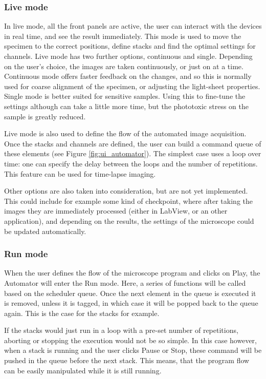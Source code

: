 \documentclass{diploma_style}
\begin{document}
\subsubsection{Live mode}
\label{automator:live}
In live mode, all the front panels are active, the user can interact with the devices in real time, and see the result immediately. This mode is used to move the specimen to the correct positions, define stacks and find the optimal settings for channels. Live mode has two further options, continuous and single. Depending on the user's choice, the images are taken continuously, or just on at a time. Continuous mode offers faster feedback on the changes, and so this is normally used for coarse alignment of the specimen, or adjusting the light-sheet properties. Single mode is better suited for sensitive samples. Using this to fine-tune the settings although can take a little more time, but the phototoxic stress on the sample is greatly reduced.

Live mode is also used to define the flow of the automated image acquisition. Once the stacks and channels are defined, the user can build a command queue of these elements (see Figure \ref{fig:ui_automator}). The simplest case uses a loop over time: one can specify the delay between the loops and the number of repetitions. This feature can be used for time-lapse imaging. 

Other options are also taken into consideration, but are not yet implemented. This could include for example some kind of checkpoint, where after taking the images they are immediately processed (either in LabView, or an other application), and depending on the results, the settings of the microscope could be updated automatically.


\subsubsection{Run mode}
When the user defines the flow of the microscope program and clicks on Play, the Automator will enter the Run mode. Here, a series of functions will be called based on the scheduler queue. Once the next element in the queue is executed it is removed, unless it is tagged, in which case it will be popped back to the queue again. This is the case for the stacks for example.

If the stacks would just run in a loop with a pre-set number of repetitions, aborting or stopping the execution would not be so simple. In this case however, when a stack is running and the user clicks Pause or Stop, these command will be pushed in the queue before the next stack. This means, that the program flow can be easily manipulated while it is still running.
 
\end{document}
